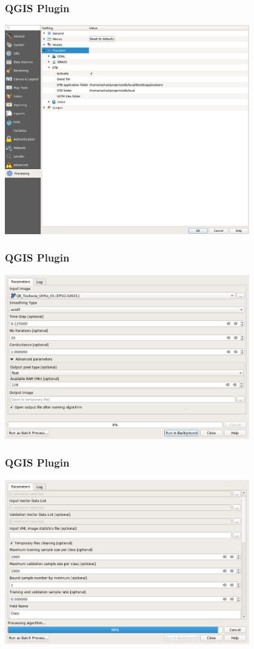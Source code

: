 \documentclass[8pt]{beamer}
\begin{document}
\begin{frame}
\frametitle{QGIS Plugin}
\begin{center}
\includegraphics[width=0.8\textwidth]{images/qgis_otb_provider_config.png}
\end{center} 
\end{frame}

\begin{frame}
\frametitle{QGIS Plugin}
\begin{center}
\includegraphics[width=0.8\textwidth]{images/qgis_smoothing.png}
\end{center} 
\end{frame}

\begin{frame}
\frametitle{QGIS Plugin}
\begin{center}
\includegraphics[width=0.8\textwidth]{images/qgis_train_classif.png}
\end{center} 
\end{frame}
\end{document}
